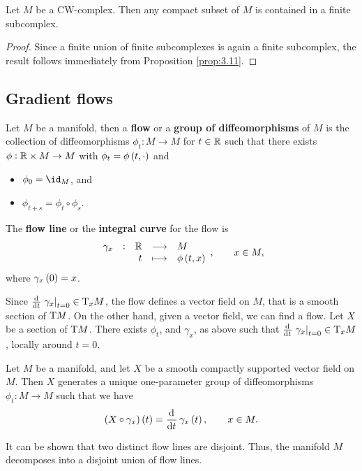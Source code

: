 \begin{corollary}
Let $ M $ be a CW-complex. Then any compact subset of $ M $ is contained in a finite subcomplex.
\end{corollary}

\begin{proof}
Since a finite union of finite subcomplexes is again a finite subcomplex, the result follows immediately from Proposition \ref{prop:3.11}.
\end{proof}

\subsection{Gradient flows}


\begin{definition}
Let $ M $ be a manifold, then a \textbf{flow} or a \textbf{group of diffeomorphisms} of $ M $ is the collection of diffeomorphisms $ \phi_t : M \to M $ for $ t \in \mathbb{R} $ such that there exists $ \phi : \mathbb{R} \times M \to M $ with $ \phi_t = \phi\br{t, \cdot} $ and
\begin{itemize}
\item $ \phi_0 = \id_M $, and
\item $ \phi_{t + s} = \phi_t \circ \phi_s $.
\end{itemize}
The \textbf{flow line} or the \textbf{integral curve} for the flow is
$$ \function[\gamma_x]{\RR}{M}{t}{\phi\br{t, x}}, \qquad x \in M, $$
where $ \gamma_x\br{0} = x $.
\end{definition}

Since $ \tod{}{t}\eval{\gamma_x}_{t = 0} \in \T_xM $, the flow defines a vector field on $ M $, that is a smooth section of $ \mathrm{T} M $. On the other hand, given a vector field, we can find a flow. Let $ X $ be a section of $ \mathrm{T} M $. There exists $ \phi_t $, and $ \gamma_x $, as above such that $ \tod{}{t}\eval{\gamma_x}_{t = 0} \in \T_xM $, locally around $ t = 0 $.

\begin{lemma}
Let $ M $ be a manifold, and let $ X $ be a smooth compactly supported vector field on $ M $. Then $ X $ generates a unique one-parameter group of diffeomorphisms $ \phi_t : M \to M $ such that we have
$$ \br{X \circ \gamma_x}\br{t} = \dod{}{t}\gamma_x\br{t}, \qquad x \in M. $$
\end{lemma}

It can be shown that two distinct flow lines are disjoint. Thus, the manifold $ M $ decomposes into a disjoint union of flow lines.

